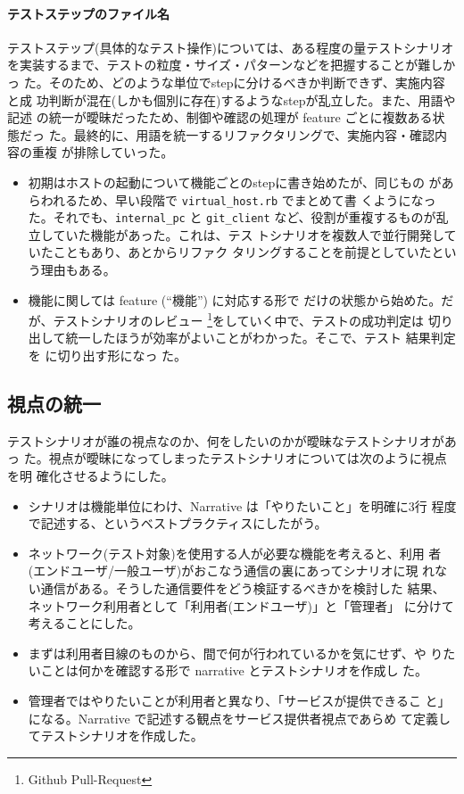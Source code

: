     \paragraph{テストステップのファイル名}
テストステップ(具体的なテスト操作)については、ある程度の量テストシナリオ
を実装するまで、テストの粒度・サイズ・パターンなどを把握することが難しかっ
た。そのため、どのような単位でstepに分けるべきか判断できず、実施内容と成
功判断が混在(しかも個別に存在)するようなstepが乱立した。また、用語や記述
の統一が曖昧だったため、制御や確認の処理が feature ごとに複数ある状態だっ
た。最終的に、用語を統一するリファクタリングで、実施内容・確認内容の重複
が排除していった。
\begin{itemize}
 \item 初期はホストの起動について機能ごとのstepに書き始めたが、同じもの
       があらわれるため、早い段階で \verb|virtual_host.rb| でまとめて書
       くようになった。それでも、\verb|internal_pc| と \verb|git_client|
       など、役割が重複するものが乱立していた機能があった。これは、テス
       トシナリオを複数人で並行開発していたこともあり、あとからリファク
       タリングすることを前提としていたという理由もある。
 \item 機能に関しては feature (``機能'') に対応する形で だけの状態から始めた。だが、テストシナリオのレビュー
       \footnote{Github Pull-Request}をしていく中で、テストの成功判定は
       切り出して統一したほうが効率がよいことがわかった。そこで、テスト
       結果判定を  に切り出す形になっ
       た。
\end{itemize}

  \subsection{視点の統一}
テストシナリオが誰の視点なのか、何をしたいのかが曖昧なテストシナリオがあっ
た。視点が曖昧になってしまったテストシナリオについては次のように視点を明
確化させるようにした。
\begin{itemize}
 \item シナリオは機能単位にわけ、Narrative は「やりたいこと」を明確に3行
       程度で記述する、というベストプラクティスにしたがう。
 \item ネットワーク(テスト対象)を使用する人が必要な機能を考えると、利用
       者(エンドユーザ/一般ユーザ)がおこなう通信の裏にあってシナリオに現
       れない通信がある。そうした通信要件をどう検証するべきかを検討した
       結果、ネットワーク利用者として「利用者(エンドユーザ)」と「管理者」
       に分けて考えることにした。
 \item まずは利用者目線のものから、間で何が行われているかを気にせず、や
       りたいことは何かを確認する形で narrative とテストシナリオを作成し
       た。
 \item 管理者ではやりたいことが利用者と異なり、「サービスが提供できるこ
       と」になる。Narrative で記述する観点をサービス提供者視点であらめ
       て定義してテストシナリオを作成した。
\end{itemize}

